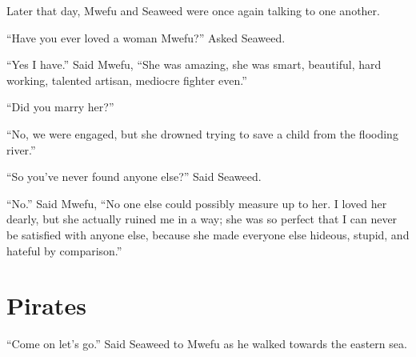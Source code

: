 \tbreak

Later that day, Mwe\-fu and Seaweed were once again talking to one another.

``Have you ever loved a woman Mwe\-fu?'' Asked Seaweed.

``Yes I have.'' Said Mwe\-fu, ``She was amazing, she was smart, beautiful, hard working, talented artisan, mediocre fighter even.''

``Did you marry her?''

``No, we were engaged, but she drowned trying to save a child from the flooding river.''

``So you've never found anyone else?'' Said Seaweed.

``No.'' Said Mwe\-fu, ``No one else could possibly measure up to her. I loved her dearly, but she actually ruined me in a way; she was so perfect that I can never be satisfied with anyone else, because she made everyone else hideous, stupid, and hateful by comparison.''

\section{Pirates}
``Come on let's go.'' Said Seaweed to Mwefu as he walked towards the eastern sea.
